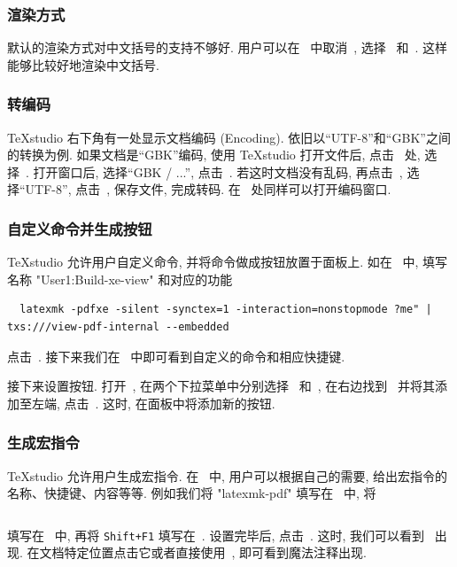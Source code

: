 \subsubsection{渲染方式}

默认的渲染方式对中文括号的支持不够好.
用户可以在\  中取消\ ,
选择\  和\ .
这样能够比较好地渲染中文括号.

\subsubsection{转编码}

\TeX studio 右下角有一处显示文档编码 (Encoding).
依旧以``UTF-8''和``GBK''之间的转换为例.
如果文档是``GBK''编码, 使用 \TeX studio 打开文件后,
点击\  处, 选择\ .
打开窗口后, 选择``GBK / ...'', 点击\ .
若这时文档没有乱码, 再点击\ ,
选择``UTF-8'', 点击\ , 保存文件, 完成转码.
在\  处同样可以打开编码窗口.

\subsubsection{自定义命令并生成按钮}

\TeX studio 允许用户自定义命令, 并将命令做成按钮放置于面板上.
如在\  中,
填写名称 "User1:Build-xe-view"
和对应的功能
\begin{lstlisting}
  latexmk -pdfxe -silent -synctex=1 -interaction=nonstopmode ?me" | txs:///view-pdf-internal --embedded
\end{lstlisting}
点击\ .
接下来我们在\  中即可看到自定义的命令和相应快捷键.

接下来设置按钮.
打开\ ,
在两个下拉菜单中分别选择\  和\ ,
在右边找到\  并将其添加至左端,
点击\ .
这时, 在面板中将添加新的按钮.

\subsubsection{生成宏指令}

\TeX studio 允许用户生成宏指令.
在\  中, 用户可以根据自己的需要,
给出宏指令的名称、快捷键、内容等等.
例如我们将 "latexmk-pdf" 填写在\  中,
将
\begin{lstlisting}[language = {[LaTeX]TeX}]
  % !TeX TXS-program:compile = txs:///latexmk/{}[-pdf -synctex=1 -interaction=nonstopmode ?me"]
\end{lstlisting}
填写在\  中,
再将 \texttt{Shift+F1} 填写在\ .
设置完毕后, 点击\ .
这时, 我们可以看到\  出现.
在文档特定位置点击它或者直接使用\ , 即可看到魔法注释出现.

